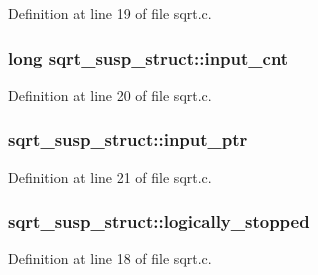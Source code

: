 Definition at line 19 of file sqrt.\+c.

\subsubsection[{\texorpdfstring{input\+\_\+cnt}{input_cnt}}]{\setlength{\rightskip}{0pt plus 5cm}long sqrt\+\_\+susp\+\_\+struct\+::input\+\_\+cnt}\hypertarget{structsqrt__susp__struct_a8c11c6f3fb7e2558e2a691d96fe1b4b3}{}\label{structsqrt__susp__struct_a8c11c6f3fb7e2558e2a691d96fe1b4b3}


Definition at line 20 of file sqrt.\+c.

\subsubsection[{\texorpdfstring{input\+\_\+ptr}{input_ptr}}]{ sqrt\+\_\+susp\+\_\+struct\+::input\+\_\+ptr}\hypertarget{structsqrt__susp__struct_a6be79e150b982314667588e148ddd8bd}{}\label{structsqrt__susp__struct_a6be79e150b982314667588e148ddd8bd}


Definition at line 21 of file sqrt.\+c.

\subsubsection[{\texorpdfstring{logically\+\_\+stopped}{logically_stopped}}]{ sqrt\+\_\+susp\+\_\+struct\+::logically\+\_\+stopped}\hypertarget{structsqrt__susp__struct_a023576444088e4aec1d15f5db3ac08cc}{}\label{structsqrt__susp__struct_a023576444088e4aec1d15f5db3ac08cc}


Definition at line 18 of file sqrt.\+c.

